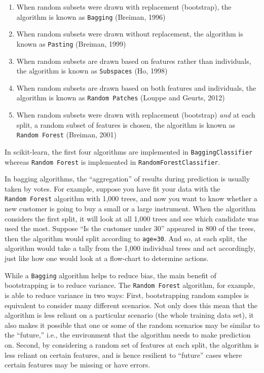 \documentclass[
]{book}
\providecommand{\tightlist}{%
  \setlength{\itemsep}{0pt}\setlength{\parskip}{0pt}}
\theoremstyle{definition}
\theoremstyle{definition}
\theoremstyle{definition}
\theoremstyle{definition}
\theoremstyle{remark}
\begin{document}
\begin{enumerate}
\def\labelenumi{\arabic{enumi}.}
\tightlist
\item
  When random subsets were drawn with replacement (bootstrap), the algorithm is known as \texttt{Bagging} (Breiman, 1996)
\item
  When random subsets were drawn without replacement, the algorithm is known as \texttt{Pasting} (Breiman, 1999)
\item
  When random subsets are drawn based on features rather than individuals, the algorithm is known as \texttt{Subspaces} (Ho, 1998)
\item
  When random subsets are drawn based on both features and individuals, the algorithm is known as \texttt{Random\ Patches} (Louppe and Geurts, 2012)
\item
  When random subsets were drawn with replacement (bootstrap) \emph{and} at each split, a random subset of features is chosen, the algorithm is known as \texttt{Random\ Forest} (Breiman, 2001)
\end{enumerate}

In scikit-learn, the first four algorithms are implemented in \texttt{BaggingClassifier} whereas \texttt{Random\ Forest} is implemented in \texttt{RandomForestClassifier}.

In bagging algorithms, the ``aggregation'' of results during prediction is usually taken by votes. For example, suppose you have fit your data with the \texttt{Random\ Forest} algorithm with 1,000 trees, and now you want to know whether a new customer is going to buy a small or a large instrument. When the algorithm considers the first split, it will look at all 1,000 trees and see which candidate was used the most. Suppose ``Is the customer under 30'' appeared in 800 of the trees, then the algorithm would split according to \texttt{age=30}. And so, at each split, the algorithm would take a tally from the 1,000 individual trees and act accordingly, just like how one would look at a flow-chart to determine actions.

While a \texttt{Bagging} algorithm helps to reduce bias, the main benefit of bootstrapping is to reduce variance. The \texttt{Random\ Forest} algorithm, for example, is able to reduce variance in two ways: First, bootstrapping random samples is equivalent to consider many different scenarios. Not only does this mean that the algorithm is less reliant on a particular scenario (the whole training data set), it also makes it possible that one or some of the random scenarios may be similar to the ``future,'' i.e., the environment that the algorithm needs to make prediction on. Second, by considering a random set of features at each split, the algorithm is less reliant on certain features, and is hence resilient to ``future'' cases where certain features may be missing or have errors.
\end{document}
